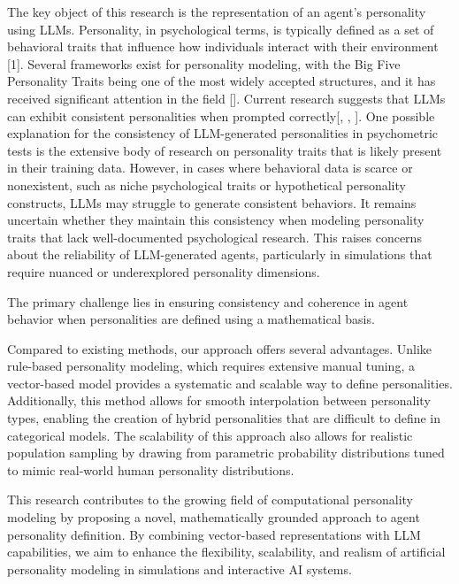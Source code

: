 \documentclass[12pt]{article}
\begin{document}
The key object of this research is the representation of an agent’s personality using LLMs. Personality, in psychological terms, is typically defined as a set of behavioral traits that influence how individuals interact with their environment [1]. Several frameworks exist for personality modeling, with the Big Five Personality Traits being one of the most widely accepted structures, and it has received significant attention in the field [\cite{john1999bigfive}]. Current research suggests that LLMs can exhibit consistent personalities when prompted correctly[\cite{serapiogarcía2023personalitytraitslargelanguage}, \cite{frisch2024llmagentsinteractionmeasuring}, \cite{klinkert2024drivinggenerativeagentspersonality}]. One possible explanation for the consistency of LLM-generated personalities in psychometric tests is the extensive body of research on personality traits that is likely present in their training data. However, in cases where behavioral data is scarce or nonexistent, such as niche psychological traits or hypothetical personality constructs, LLMs may struggle to generate consistent behaviors. It remains uncertain whether they maintain this consistency when modeling personality traits that lack well-documented psychological research. This raises concerns about the reliability of LLM-generated agents, particularly in simulations that require nuanced or underexplored personality dimensions.

The primary challenge lies in ensuring consistency and coherence in agent behavior when personalities are defined using a mathematical basis. 

Compared to existing methods, our approach offers several advantages. Unlike rule-based personality modeling, which requires extensive manual tuning, a vector-based model provides a systematic and scalable way to define personalities. Additionally, this method allows for smooth interpolation between personality types, enabling the creation of hybrid personalities that are difficult to define in categorical models. The scalability of this approach also allows for realistic population sampling by drawing from parametric probability distributions tuned to mimic real-world human personality distributions.

This research contributes to the growing field of computational personality modeling by proposing a novel, mathematically grounded approach to agent personality definition. By combining vector-based representations with LLM capabilities, we aim to enhance the flexibility, scalability, and realism of artificial personality modeling in simulations and interactive AI systems.


\printbibliography
    
\end{document}
